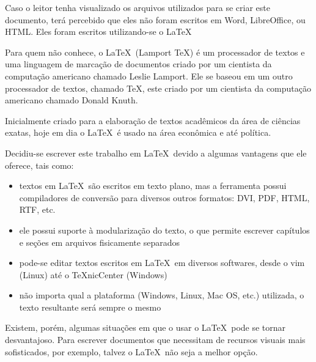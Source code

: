 Caso o leitor tenha visualizado os arquivos utilizados para se criar este documento, ter\'a percebido que eles n\~ao foram escritos em Word, LibreOffice, ou HTML. Eles foram escritos utilizando-se o \LaTeX\
 
Para quem n\~ao conhece, o \LaTeX\ (Lamport TeX) \'e um processador de textos e uma linguagem de marca\c c\~ao de documentos criado por um cientista da computa\c c\~ao americano chamado Leslie Lamport. Ele se baseou em um outro processador de textos, chamado TeX, este criado por um cientista da computa\c c\~ao americano chamado Donald Knuth. 

Inicialmente criado para a elabora\c c\~ao de textos acad\^emicos da \'area de ci\^encias exatas, hoje em dia o \LaTeX\ \'e usado na \'area econ\^omica e at\'e pol\'itica. 

\pagebreak

Decidiu-se escrever este trabalho em \LaTeX\ devido a algumas vantagens que ele oferece, tais como:

\begin{itemize}
\item textos em \LaTeX\ s\~ao escritos em texto plano, mas a ferramenta possui compiladores de convers\~ao para diversos outros formatos: DVI, PDF, HTML, RTF, etc.
\item ele possui suporte \`a modulariza\c c\~ao do texto, o que permite escrever cap\'itulos e se\c c\~oes em arquivos fisicamente separados
\item pode-se editar textos escritos em \LaTeX\ em diversos softwares, desde o vim (Linux) at\'e o TeXnicCenter (Windows)
\item n\~ao importa qual a plataforma (Windows, Linux, Mac OS, etc.) utilizada, o texto resultante ser\'a sempre o mesmo
\end{itemize}

Existem, por\'em, algumas situa\c c\~oes em que o usar o \LaTeX\ pode se tornar desvantajoso. Para escrever documentos que necessitam de recursos visuais mais sofisticados, por exemplo, talvez o \LaTeX\ n\~ao seja a melhor op\c c\~ao.
